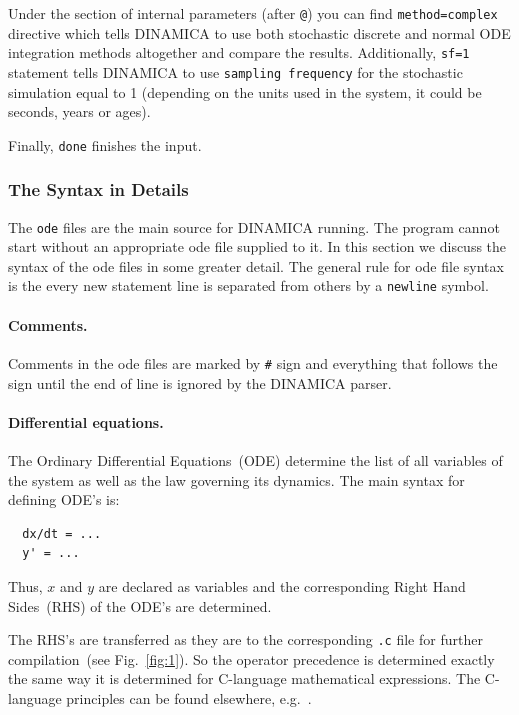 \documentclass[11pt,a4paper]{article}
\begin{document}
Under the section of internal parameters (after \texttt{@}) you can find
\texttt{method=complex} directive which tells DINAMICA to use both stochastic
discrete and normal ODE integration methods altogether and compare the
results. Additionally, \texttt{sf=1} statement tells DINAMICA to use \texttt{sampling
  frequency} for the stochastic simulation equal to 1 (depending on the units used in
the system, it could be seconds, years or ages).

Finally, \texttt{done} finishes the input.

\subsubsection{The Syntax in Details}
\label{sec:syntax-details}

The \texttt{ode} files are the main source for DINAMICA running. The program cannot
start without an appropriate ode file supplied to it. In this section we discuss the
syntax of the ode files in some greater detail. The general rule for ode file syntax
is the every new statement line is separated from others by a \texttt{newline}
symbol.

\paragraph{Comments.}
\label{sec:comments}

Comments in the ode files are marked by \verb'#' sign and everything that follows the
sign until the end of line is ignored by the DINAMICA parser.

\paragraph{Differential equations.}
\label{sec:diff-equat}

The Ordinary Differential Equations~(ODE) determine the list of all variables of the
system as well as the law governing its dynamics. The main syntax for defining ODE's is:
\begin{verbatim}
  dx/dt = ...
  y' = ...
\end{verbatim}

Thus, $x$ and $y$ are declared as variables and the corresponding Right Hand
Sides~(RHS) of the ODE's are determined.

The RHS's are transferred as they are to the corresponding \texttt{.c} file for
further compilation~(see Fig.~\ref{fig:1}). So the operator precedence is determined
exactly the same way it is determined for C-language mathematical expressions. The
C-language principles can be found elsewhere, e.g.~\cite{Cproglang}.
\end{document}
